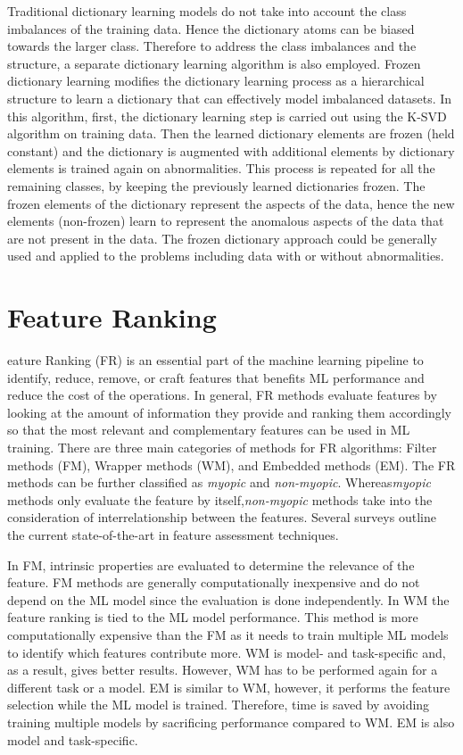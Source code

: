Traditional dictionary learning models do not take into account the class imbalances of the training data. Hence the dictionary atoms can be biased towards the larger class. Therefore to address the class imbalances and the structure, a separate dictionary learning algorithm is also employed. Frozen dictionary learning modifies the dictionary learning process as a hierarchical structure to learn a dictionary that can effectively model imbalanced datasets\cite{Carroll2017}. In this algorithm, first, the dictionary learning step is carried out using the K-SVD algorithm on  training data. Then the learned dictionary elements are frozen (held constant) and the dictionary is augmented with additional elements by dictionary elements is trained again on abnormalities. This process is repeated for all the remaining classes, by keeping the previously learned dictionaries frozen. The frozen elements of the dictionary represent the  aspects of the data, hence the new elements (non-frozen) learn to represent the anomalous aspects of the data that are not present in the  data. The frozen dictionary approach could be generally used and applied to the problems including data with or without abnormalities.


\section{Feature Ranking}

eature Ranking (FR) is an essential part of the machine learning pipeline to identify, reduce, remove, or craft features that benefits ML performance and reduce the cost of the operations. In general, FR methods evaluate features by looking at the amount of information they provide and ranking them accordingly so that the most relevant and complementary features can be used in ML training. There are three main categories of methods for FR algorithms: Filter methods (FM), Wrapper methods (WM), and Embedded methods (EM). The FR methods can be further classified as \emph{myopic} and \emph{non-myopic}. Whereas\emph{myopic} methods only evaluate the feature by itself,\emph{non-myopic} methods take into the consideration of interrelationship between the features. Several surveys outline the current state-of-the-art in feature assessment techniques\cite{Uthman2020, Sangodiah2014, Effrosynidis2021, Jovic2015}.

In FM, intrinsic properties are evaluated to determine the relevance of the feature. FM methods are generally computationally inexpensive and do not depend on the ML model since the evaluation is done independently. In WM the feature ranking is tied to the ML model performance. This method is more computationally expensive than the FM as it needs to train multiple ML models to identify which features contribute more. WM is model- and task-specific and, as a result, gives better results. However, WM has to be performed again for a different task or a model. EM is similar to WM, however, it performs the feature selection while the ML model is trained. Therefore, time is saved by avoiding training multiple models by sacrificing performance compared to WM\@. EM is also model and task-specific.  

